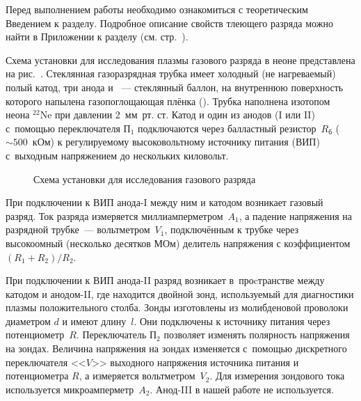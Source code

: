 


Перед выполнением работы необходимо ознакомиться с 
теоретическим Введением к разделу.
Подробное описание свойств тлеющего разряда можно найти в Приложении к разделу
(см. стр.~\pageref{sec:discharge}).

Схема установки для исследования плазмы газового разряда в неоне представлена на
рис.~. Стеклянная газоразрядная
трубка имеет холодный (не нагреваемый) полый катод, три анода и
~--- стеклянный баллон, на
внутреннюю поверхность которого напылена газопоглощающая плёнка
(). Трубка наполнена изотопом неона
$^{22}$Ne при давлении 2~мм~рт. ст. Катод и один из анодов (I или II) с~помощью
переключателя $\text{П}_1$ подключаются через
балластный резистор~$R_\text{б}$ ($\sim500$~кОм) к регулируемому высоковольтному
источнику питания (ВИП) с~выходным
напряжением до нескольких киловольт.

\begin{figure}[h!]
    \centering
    \footnotesize
	\caption{Схема установки для исследования газового разряда}
\end{figure}

При подключении к ВИП анода-I между ним и катодом возникает газовый разряд. Ток
разряда измеряется миллиамперметром~$A_1$, а падение напряжения на разрядной трубке~--- 
вольтметром~$V_{1}$, подключённым к трубке через
высокоомный (несколько десятков МОм) делитель напряжения с коэффициентом
$(R_1+R_2)/R_2$.

При подключении к ВИП анода-II разряд возникает в~проcтранстве между катодом и
анодом-II, где находится двойной зонд,
используемый для диагностики плазмы положительного столба. Зонды изготовлены из
молибденовой проволоки диаметром
$d$ и имеют длину~$l$. Они подключены к источнику питания через
потенциометр~$R$. Переключатель
$\text{П}_2$ позволяет изменять полярность напряжения на зондах. Величина
напряжения на зондах изменяется с~помощью дискретного
переключателя <<$V$>> выходного напряжения источника питания и потенциометра
$R$, а измеряется вольтметром~$V_2$. Для
измерения зондового тока используется микроамперметр~$A_2$.
Анод-III в нашей работе не используется.

